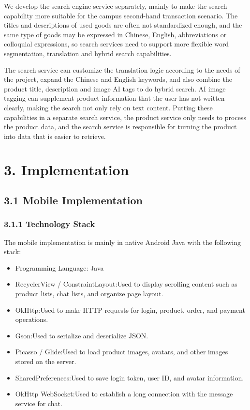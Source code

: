 \documentclass{article}
\begin{document}
We develop the search engine service separately, mainly to make the search capability more suitable for the campus second-hand transaction scenario. The titles and descriptions of used goods are often not standardized enough, and the same type of goods may be expressed in Chinese, English, abbreviations or colloquial expressions, so search services need to support more flexible word segmentation, translation and hybrid search capabilities.

The search service can customize the translation logic according to the needs of the project, expand the Chinese and English keywords, and also combine the product title, description and image AI tags to do hybrid search. AI image tagging can supplement product information that the user has not written clearly, making the search not only rely on text content. Putting these capabilities in a separate search service, the product service only needs to process the product data, and the search service is responsible for turning the product into data that is easier to retrieve.

\section{3. Implementation}

\subsection{3.1 Mobile Implementation}

\subsubsection{3.1.1 Technology Stack}

The mobile implementation is mainly in native Android Java with the following stack:

\begin{itemize}
    \item Programming Language: Java
    \item RecyclerView / ConstraintLayout:Used to display scrolling content such as product lists, chat lists, and organize page layout.
    \item OkHttp:Used to make HTTP requests for login, product, order, and payment operations.
    \item Gson:Used to serialize and deserialize JSON.
    \item Picasso / Glide:Used to load product images, avatars, and other images stored on the server.
    \item SharedPreferences:Used to save login token, user ID, and avatar information.
    \item OkHttp WebSocket:Used to establish a long connection with the message service for chat.
\end{itemize}
\end{document}
